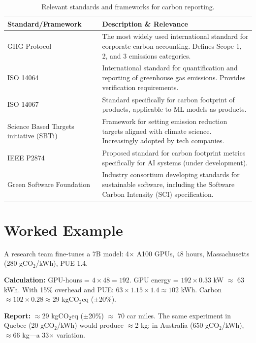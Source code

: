 \documentclass{article}
\theoremstyle{plain}
\theoremstyle{definition}
\theoremstyle{remark}
\begin{document}
\vspace{1em}
\begin{table}[!ht]
\caption{Relevant standards and frameworks for carbon reporting.}
\label{tab:standards}
\begin{center}
\begin{tabular}{p{4cm}p{10cm}}
\toprule
\textbf{Standard/Framework} & \textbf{Description \& Relevance} \\
\midrule
GHG Protocol & The most widely used international standard for corporate carbon accounting. Defines Scope 1, 2, and 3 emissions categories. \\
ISO 14064 & International standard for quantification and reporting of greenhouse gas emissions. Provides verification requirements. \\
ISO 14067 & Standard specifically for carbon footprint of products, applicable to ML models as products. \\
Science Based Targets initiative (SBTi) & Framework for setting emission reduction targets aligned with climate science. Increasingly adopted by tech companies. \\
IEEE P2874 & Proposed standard for carbon footprint metrics specifically for AI systems (under development). \\
Green Software Foundation & Industry consortium developing standards for sustainable software, including the Software Carbon Intensity (SCI) specification. \\
\bottomrule
\end{tabular}
\end{center}
\end{table}

\section{Worked Example}
\label{app:examples}

A research team fine-tunes a 7B model: 4$\times$ A100 GPUs, 48 hours, Massachusetts (280 gCO$_2$/kWh), PUE 1.4.

\textbf{Calculation:} GPU-hours = $4 \times 48 = 192$. GPU energy = $192 \times 0.33$ kW $\approx$ 63 kWh. With 15\% overhead and PUE: $63 \times 1.15 \times 1.4 \approx 102$ kWh. Carbon $\approx 102 \times 0.28 \approx 29$ kgCO$_2$eq ($\pm$20\%).

\textbf{Report:} $\approx$29 kgCO$_2$eq ($\pm$20\%) $\approx$ 70 car miles. The same experiment in Quebec (20 gCO$_2$/kWh) would produce $\approx$2 kg; in Australia (650 gCO$_2$/kWh), $\approx$66 kg---a 33$\times$ variation.
\end{document}
